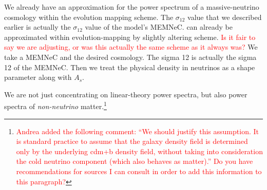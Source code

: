 We already have an approximation for the power spectrum of a massive-neutrino cosmology within the evolution mapping scheme. The $\sigma_{12}$ value that we described earlier is actually the $\sigma_{12}$ value of the model's MEMNeC. can already be approximated within evolution-mapping by slightly altering scheme. \textcolor{red}{Is it fair to say we are adjusting, or was this actually the same scheme as it always was?} We take a MEMNeC and the desired cosmology. The sigma 12 is actually the sigma 12 of the MEMNeC. Then we treat the physical density in neutrinos as a shape parameter along with $A_s$.

We are not just concentrating on linear-theory power spectra, but also power
spectra of 
\textit{non-neutrino} 
matter.\footnote{\textcolor{red}{Andrea added the following comment: ``We 
should 
justify this assumption. It is standard practice to assume that the galaxy 
density field is determined only by the underlying cdm+b density field, 
without taking into consideration the cold neutrino component (which also 
behaves as matter).'' Do you have recommendations for sources I can consult in
order to add this information to this paragraph?}}